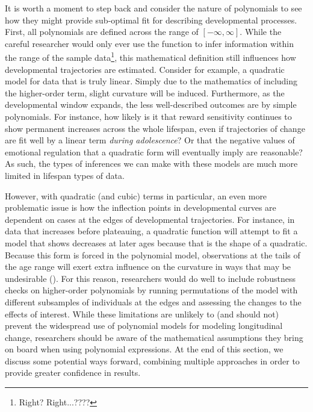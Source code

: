 \documentclass[11pt]{article}
\begin{document}
It is worth a moment to step back and consider the nature of polynomials to see how they might provide sub-optimal fit for describing developmental processes. First, all polynomials are defined across the range of $\left[-\infty, \infty \right]$. While the careful researcher would only ever use the function to infer information within the range of the sample data\footnote{Right? Right...????}, this mathematical definition still influences how developmental trajectories are estimated. Consider for example, a quadratic model for data that is truly linear. Simply due to the mathematics of including the higher-order term, slight curvature will be induced. Furthermore, as the developmental window expands, the less well-described outcomes are by simple polynomials. For instance, how likely is it that reward sensitivity continues to show permanent increases across the whole lifespan, even if trajectories of change are fit well by a linear term \textit{during adolescence}? Or that the negative values of emotional regulation that a quadratic form will eventually imply are reasonable? As such, the types of inferences we can make with these models are much more limited in lifespan types of data.

However, with quadratic (and cubic) terms in particular, an even more problematic issue is how the inflection points in developmental curves are dependent on cases at the edges of developmental trajectories. For instance, in data that increases before plateauing, a quadratic function will attempt to fit a model that shows decreases at later ages because that is the shape of a quadratic. Because this form is forced in the polynomial model, observations at the tails of the age range will exert extra influence on the curvature in ways that may be undesirable (\cite{fjell_when_2010}). For this reason, researchers would do well to include robustness checks on higher-order polynomials by running permutations of the model with different subsamples of individuals at the edges and assessing the changes to the effects of interest. While these limitations are unlikely to (and should not) prevent the widespread use of polynomial models for modeling longitudinal change, researchers should be aware of the mathematical assumptions they bring on board when using polynomial expressions. At the end of this section, we discuss some potential ways forward, combining multiple approaches in order to provide greater confidence in results.
\end{document}
